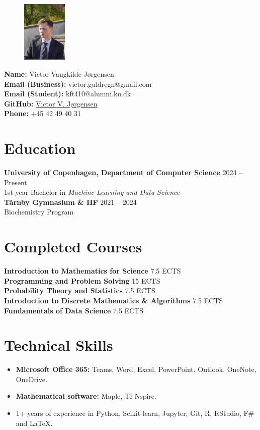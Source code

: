 \documentclass[a4paper,10pt]{article}
\makeatletter
\newcommand{\name}{Victor Vangkilde Jørgensen}
\newcommand{\phone}{+45 42 49 40 31}
\newcommand{\emailBusiness}{victor.guldregn@gmail.com}
\newcommand{\emailStudent}{kft410@alumni.ku.dk}
\makeatother
\begin{document}
\begin{figure}[h!]
    \centering
    \includegraphics[width=0.19\textwidth, trim={3cm 2cm 1.5cm 4cm}, clip, cfbox=gr 1.25pt 0pt]{profilbillede.jpg}
\end{figure}

\noindent
\textbf{Name:} \name\\
\textbf{Email (Business):} \emailBusiness\\
\textbf{Email (Student):} \emailStudent\\
\textbf{GitHub:} \href{https://github.com/P1N60}{Victor V. Jørgensen}\\
\textbf{Phone:} \phone
\n
\section*{Education}
\textbf{University of Copenhagen, Department of Computer Science} \hfill 2024 -- Present \\
1st-year Bachelor in \textit{Machine Learning and Data Science}\\
\textbf{T\aa rnby Gymnasium \& HF} \hfill 2021 -- 2024\\ 
Biochemistry Program
\n
\section*{Completed Courses}
\textbf{Introduction to Mathematics for Science} \hfill 7.5 ECTS\\
\textbf{Programming and Problem Solving} \hfill 15 ECTS\\
\textbf{Probability Theory and Statistics} \hfill 7.5 ECTS\\
\textbf{Introduction to Discrete Mathematics \& Algorithms} \hfill 7.5 ECTS\\ 
\textbf{Fundamentals of Data Science} \hfill 7.5 ECTS
\n
\section*{Technical Skills}
\begin{itemize}[noitemsep, topsep=0pt]
    \item \textbf{Microsoft Office 365:} Teams, Word, Excel, PowerPoint, Outlook, OneNote, OneDrive. 
    \item \textbf{Mathematical software:} Maple, TI-Nspire.
    \item 1+ years of experience in Python, Scikit-learn, Jupyter, Git, R, RStudio, F\# and \LaTeX.
\end{itemize}
\n
\end{document}
